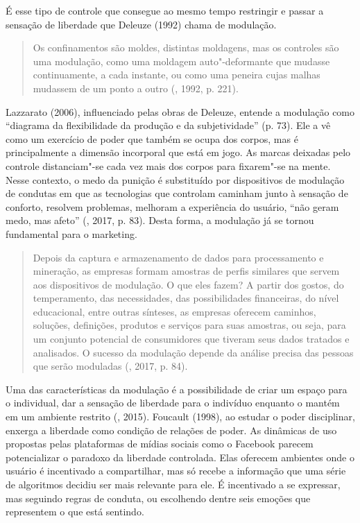 É esse tipo de controle que consegue ao mesmo tempo restringir e passar
a sensação de liberdade que Deleuze (1992) chama de modulação.

\begin{quote}
Os confinamentos são moldes, distintas moldagens, mas os controles são
uma modulação, como uma moldagem auto"-deformante que mudasse
continuamente, a cada instante, ou como uma peneira cujas malhas
mudassem de um ponto a outro (, 1992, p. 221).
\end{quote}

Lazzarato (2006), influenciado pelas obras de Deleuze, entende a
modulação como ``diagrama da flexibilidade da produção e da
subjetividade'' (p. 73). Ele a vê como um exercício de poder que também se
ocupa dos corpos, mas é principalmente a dimensão incorporal que está em
jogo. As marcas deixadas pelo controle distanciam"-se cada vez mais dos
corpos para fixarem"-se na mente. Nesse contexto, o medo da punição é
substituído por dispositivos de modulação de condutas em que as
tecnologias que controlam caminham junto à sensação de conforto,
resolvem problemas, melhoram a experiência do usuário, ``não geram medo,
mas afeto'' (, 2017, p. 83). Desta forma, a modulação já se tornou
fundamental para o marketing.

\begin{quote}
Depois da captura e armazenamento de dados para processamento e
mineração, as empresas formam amostras de perfis similares que servem
aos dispositivos de modulação. O que eles fazem? A partir dos gostos, do
temperamento, das necessidades, das possibilidades financeiras, do nível
educacional, entre outras sínteses, as empresas oferecem caminhos,
soluções, definições, produtos e serviços para suas amostras, ou seja,
para um conjunto potencial de consumidores que tiveram seus dados
tratados e analisados. O sucesso da modulação depende da análise precisa
das pessoas que serão moduladas (, 2017, p. 84).
\end{quote}

Uma das características da modulação é a possibilidade de criar um
espaço para o individual, dar a sensação de liberdade para o indivíduo
enquanto o mantém em um ambiente restrito (, 2015).
Foucault (1998), ao estudar o poder disciplinar, enxerga a liberdade como condição de
relações de poder. As dinâmicas de uso propostas pelas plataformas de
mídias sociais como o Facebook parecem potencializar o paradoxo da
liberdade controlada. Elas oferecem ambientes onde o usuário é
incentivado a compartilhar, mas só recebe a informação que uma série de
algoritmos decidiu ser mais relevante para ele. É incentivado a se
expressar, mas seguindo regras de conduta, ou escolhendo dentre seis
emoções que representem o que está sentindo.

